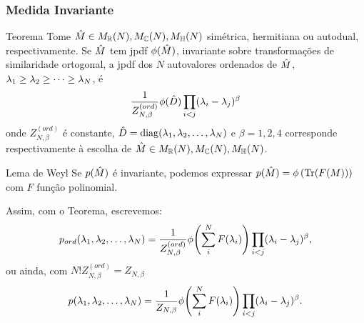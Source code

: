 \begin{frame}
	\frametitle{Medida Invariante}
	\begin{block}{Teorema}
		Tome $\hat M \in M_{\mathbb{R}}(N),  M_{\mathbb{C}}(N),  M_{\mathbb{H}}(N)$ simétrica, hermitiana ou autodual, respectivamente. Se  $\hat M$ tem jpdf $\phi(\hat M)$, invariante sobre transformações de similaridade ortogonal, a jpdf dos $N$ autovalores ordenados de $\hat M$, $\lambda_1 \geq \lambda_2 \geq \dots \geq \lambda_N$, é $$ \frac{1}{Z_{N, \beta}^{(ord)}} \phi(\hat D) \prod_{i < j} (\lambda_i - \lambda_j)^{\beta}$$ onde $Z_{N, \beta}^{(ord)}$ é constante, $\hat D = \operatorname{diag}(\lambda_1, \lambda_2, \dots, \lambda_N)$ e $\beta = 1, 2, 4$ corresponde respectivamente à escolha de $\hat M \in M_{\mathbb{R}}(N),  M_{\mathbb{C}}(N),  M_{\mathbb{H}}(N)$. 
	\end{block}
\end{frame}
\begin{frame}
	
 	\begin{block}{Lema de Weyl}
 		Se $p(\hat M)$ é invariante, podemos expressar $p(\hat M)= \phi \left(\Tr(F(M)) \right)$ com $F$ função polinomial.
 	\end{block}
	Assim, com o Teorema, escrevemos: 
	\[
		p_{ord}(\lambda_1, \lambda_2, \dots, \lambda_N) = \frac{1}{Z_{N, \beta}^{(ord)}} \phi{\left( \sum_i^N F(\lambda_i) \right)} \prod_{i < j} (\lambda_i - \lambda_j)^{\beta},
	\]
	ou ainda, com $N! Z_{N, \beta}^{(ord)} = Z_{N, \beta}$
	\begin{equation}
		p(\lambda_1, \lambda_2, \dots, \lambda_N) = \frac{1}{Z_{N, \beta}} \phi{\left( \sum_i^N F(\lambda_i) \right)} \prod_{i < j} (\lambda_i - \lambda_j)^{\beta}.
		\label{Equation: p}
	\end{equation}
\end{frame}

